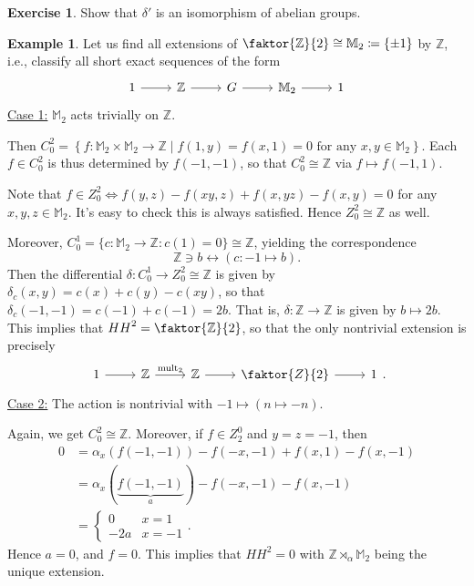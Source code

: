 \documentclass[10pt,letterpaper,cm]{nupset}
\theoremstyle{definition}
\newtheorem{exmp}[definition]{Example}
\theoremstyle{theorem}
\newtheorem{exercise}[definition]{Exercise}
\theoremstyle{remark}
\newcommand{\M}{\mathbb M}
\newcommand{\Z}{\mathbb Z}
\newcommand{\1}{\mathbf{1}}
\newcommand{\0}{\vec 0}
\DeclareMathOperator{\mult}{mult}
\begin{document}
\begin{exercise}
Show that $\delta '$ is an isomorphism of abelian groups.
\end{exercise}

\begin{exmp}
Let us find all extensions of $\faktor{\Z}{2}\cong \M_2 \coloneqq  \{\pm1\}$ by $\Z$, i.e., classify all short exact sequences of the form
\[
\begin{tikzcd}
1 \arrow[r] & \Z \arrow[r] & G \arrow[r] & \M_2 \arrow[r] & 1
\end{tikzcd}
\]
\underline{Case 1:} $\M_2$ acts trivially on $\Z$. 

Then $C^2_0 = \left\{f : \M_2 \times \M_2 \to \Z \mid f(1, y) = f(x, 1) = 0 \text{ for any } x,y \in \M_2 \right\}$. Each $f \in C^2_0$ is thus determined by $f(-1, -1)$, so that $C^2_0 \cong \Z$ via $f\mapsto f(-1, 1)$.

\medskip

 Note that $f\in Z^2_0 \iff f(y, z)-f(xy, z)+f(x, yz)-f(x, y) =0$ for any $x, y, z\in \M_2$. It's easy to check this is always satisfied. Hence $Z^2_0 \cong \Z$ as well. 

\medskip

 Moreover, $C^1_0 = \{c : \M_2 \to \Z : c(1) =0\} \cong \Z$, yielding the correspondence $$\Z \ni b \longleftrightarrow \left(c: {-1} \mapsto b\right).$$ Then the differential $\delta : C^1_0 \to Z^2_0\cong \Z$ is given by $\delta_c(x, y) = c(x)+c(y) -c(xy)$, so that $\delta_c({-1}, {-1}) = c({-1}) + c({-1}) = 2b$. That is, $\delta : \Z \to \Z$ is given by $b \mapsto 2b$. This implies that ${HH}^2 = \faktor{\Z}{2}$, so that the only nontrivial extension is precisely
\[
\begin{tikzcd}
1 \arrow[r] & \Z \arrow[r, "\mult_2"] & \Z \arrow[r] & \faktor{Z}{2} \arrow[r] & 1
\end{tikzcd}.
\]
\underline{Case 2:} The action is nontrivial with ${-1} \mapsto \left(n \mapsto {-n}\right)$. 

 Again, we get $C^2_0 \cong \Z$. Moreover, if $f\in Z_2^0$ and $y= z = {-1}$, then 
\begin{align*}
0 & = \alpha_x(f({-1}, {-1})) - f({-x}, {-1})+ f(x, 1)- f(x, {-1})
\\ & = \alpha_x(\underbrace{f({-1}, {-1})}_a) - f({-x}, {-1})- f(x, {-1}) 
\\ & =
\begin{cases}
0 & x =1 \\
{-2a} & x = {-1}
\end{cases}.
\end{align*}
Hence $a = 0$, and $f = 0$. This implies that ${HH}^2 = 0$ with $\Z \rtimes_{\alpha} \M_2$ being the unique extension. 
\end{exmp}
\end{document}
